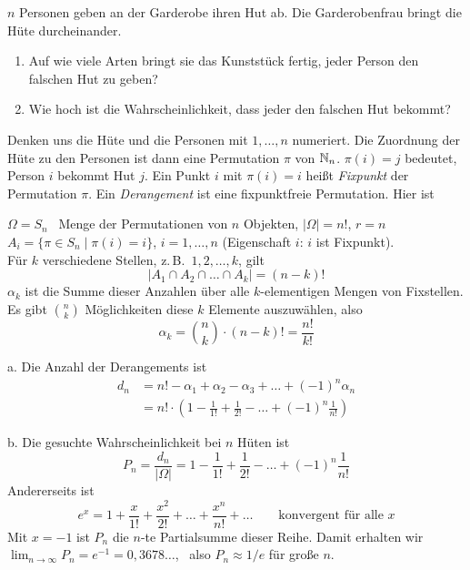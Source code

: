 \begin{beispiel}
$n$ Personen geben an der Garderobe ihren Hut ab. Die Garderobenfrau bringt die Hüte durcheinander.
\begin{enumerate}[label=\alph*.]
\item Auf wie viele Arten bringt sie das Kunststück fertig, jeder Person den falschen Hut zu geben?
\item Wie hoch ist die Wahrscheinlichkeit, dass jeder den falschen Hut bekommt?
\end{enumerate}

Denken uns die Hüte und die Personen mit $1, \dots, n$ numeriert. Die Zuordnung der Hüte zu den Personen ist dann eine Permutation $\pi$ von $\mathbb{N}_n$.
$\pi(i) = j$ bedeutet, Person $i$ bekommt Hut $j$.
Ein Punkt $i$ mit $\pi(i) = i$ heißt \emph{Fixpunkt} der Permutation $\pi$. Ein \emph{Derangement} ist eine fixpunktfreie Permutation. Hier ist

$\Omega = S_n$ \ Menge der Permutationen von $n$ Objekten, \quad $|\Omega| = n!$, \quad $r = n$\\
$A_i = \{ \pi \in S_n \mid \pi(i) = i \}$, \quad $i = 1, \dots, n$ \quad (Eigenschaft $i$: $i$ ist Fixpunkt).\\
Für $k$ verschiedene Stellen, z.\,B.\ $1, 2, \dots, k$, gilt
\[
|A_1 \cap A_2 \cap \dots \cap A_k| = (n-k)!
\]
$\alpha_k$ ist die Summe dieser Anzahlen über alle $k$-elementigen Mengen von Fixstellen.
Es gibt $\binom{n}{k}$ Möglichkeiten diese $k$ Elemente auszuwählen, also
\[
\alpha_k = \binom{n}{k}\cdot(n-k)! = \frac{n!}{k!}
\]

a. Die Anzahl der Derangements ist
\begin{align*}
d_n &= n! - \alpha_1 + \alpha_2 - \alpha_3 + \dots + (-1)^n \alpha_n \\
&= n! \cdot \left(1 - \frac{1}{1!} + \frac{1}{2!} - \dots + (-1)^n\frac{1}{n!}\right)
\end{align*}

b. Die gesuchte Wahrscheinlichkeit bei $n$ Hüten ist
\[
P_n = \frac{d_n}{|\Omega|} = 1 - \frac{1}{1!} + \frac{1}{2!} - \dots + (-1)^n\frac{1}{n!}
\]
Andererseits ist
\[
e^x = 1 + \frac{x}{1!} + \frac{x^2}{2!} + \dots + \frac{x^n}{n!} + \dots \qquad \text{konvergent für alle } x
\]
Mit $x = -1$ ist $P_n$ die $n$-te Partialsumme dieser Reihe. Damit erhalten wir \quad $\lim_{n \to \infty} P_n = e^{-1} = 0{,}3678\ldots$, \ also $P_n \approx 1/e$ für große $n$.
\end{beispiel}

